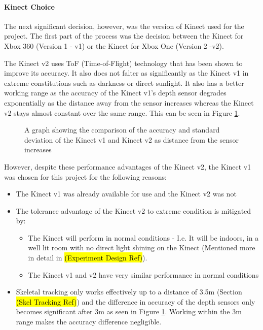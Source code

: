 \paragraph{Kinect Choice}
The next significant decision, however, was the version of Kinect used for the project. The first part of the process was the decision between the Kinect for Xbox 360 (Version 1 - v1) or the Kinect for Xbox One (Version 2 -v2). 

The Kinect v2 uses ToF (Time-of-Flight) technology that has been shown to improve its accuracy. It also does not falter as significantly as the Kinect v1 in extreme constitutions such as darkness or direct sunlight. It also has a better working range as the accuracy of the Kinect v1's depth sensor degrades exponentially as the distance away from the sensor increases whereas the Kinect v2 stays almost constant over the same range. \cite{kinectComp2011} This can be seen in Figure \ref{fig:kinectV1V2Depth}. 

\begin{figure}[ht]
	\centering
	{%
		\setlength{\fboxsep}{0pt}%
		\setlength{\fboxrule}{0.5pt}%
		}
	\caption{A graph showing the comparison of the accuracy and standard deviation of the Kinect v1 and Kinect v2 as distance from the sensor increases \cite{kinectComp2011}}
	\label{fig:kinectV1V2Depth}
\end{figure}

However, despite these performance advantages of the Kinect v2, the Kinect v1 was chosen for this project for the following reasons:

\begin{itemize}
	\item The Kinect v1 was already available for use and the Kinect v2 was not
	\item The tolerance advantage of the Kinect v2 to extreme condition is mitigated by:
	\begin{itemize}
		\item The Kinect will perform in normal conditions - I.e. It will be indoors, in a well lit room with no direct light shining on the Kinect (Mentioned more in detail in \hl{(Experiment Design Ref)}).
		\item The Kinect v1 and v2 have very similar performance in normal conditions \cite{kinectComp2011}
	\end{itemize}
	\item Skeletal tracking only works effectively up to a distance of 3.5m (Section \hl{(Skel Tracking Ref)}) and the difference in accuracy of the depth sensors only becomes significant after 3m as seen in Figure \ref{fig:kinectV1V2Depth}. Working within the 3m range makes the accuracy difference negligible.
\end{itemize}

